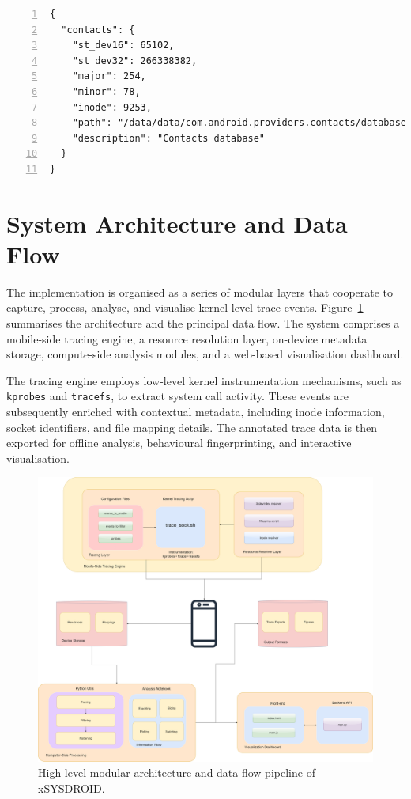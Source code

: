\documentclass[a4paper,12pt]{report}
\begin{document}
\begin{lstlisting}[caption={Serialized JSON metadata for sensitive resource mapping},label={lst:json-metadata},numbers=left]
{
  "contacts": {
    "st_dev16": 65102,
    "st_dev32": 266338382,
    "major": 254,
    "minor": 78,
    "inode": 9253,
    "path": "/data/data/com.android.providers.contacts/databases/contacts2.db",
    "description": "Contacts database"
  }
}
\end{lstlisting}

\section{System Architecture and Data Flow}
The implementation is organised as a series of modular layers that cooperate to capture, process, analyse, and visualise kernel‑level trace events. Figure~\ref{fig:architecture} summarises the architecture and the principal data flow. The system comprises a mobile-side tracing engine, a resource resolution layer, on-device metadata storage, compute-side analysis modules, and a web-based visualisation dashboard.

The tracing engine employs low-level kernel instrumentation mechanisms, such as \texttt{kprobes} and \texttt{tracefs}, to extract system call activity. These events are subsequently enriched with contextual metadata, including inode information, socket identifiers, and file mapping details. The annotated trace data is then exported for offline analysis, behavioural fingerprinting, and interactive visualisation.
\begin{figure}[H]
\centering
\includegraphics[width=1\textwidth]{xsysdroid.png}
\caption{High-level modular architecture and data-flow pipeline of xSYSDROID.}
\label{fig:architecture}
\end{figure}
\end{document}
